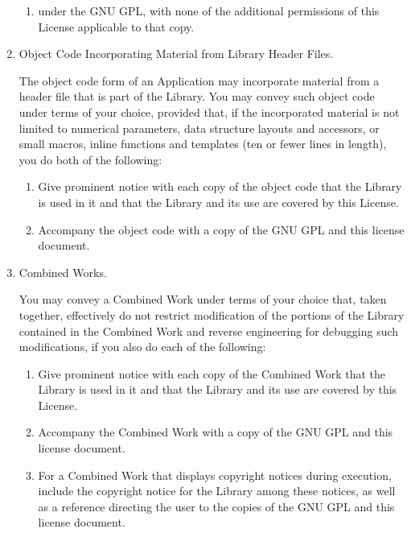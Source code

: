 \documentclass[11pt,a4paper, twoside]{article}
\begin{document}
\begin{enumerate}
\begin{enumerate}
   \item under the GNU GPL, with none of the additional permissions of
   this License applicable to that copy.
   \end{enumerate}

\item Object Code Incorporating Material from Library Header Files.

  The object code form of an Application may incorporate material from
a header file that is part of the Library.  You may convey such object
code under terms of your choice, provided that, if the incorporated
material is not limited to numerical parameters, data structure
layouts and accessors, or small macros, inline functions and templates
(ten or fewer lines in length), you do both of the following:

   \begin{enumerate}
   \item Give prominent notice with each copy of the object code that the
   Library is used in it and that the Library and its use are
   covered by this License.

   \item Accompany the object code with a copy of the GNU GPL and this license
   document.
   \end{enumerate}

\item Combined Works.

  You may convey a Combined Work under terms of your choice that,
taken together, effectively do not restrict modification of the
portions of the Library contained in the Combined Work and reverse
engineering for debugging such modifications, if you also do each of
the following:

   \begin{enumerate}
   \item Give prominent notice with each copy of the Combined Work that
   the Library is used in it and that the Library and its use are
   covered by this License.

   \item Accompany the Combined Work with a copy of the GNU GPL and this license
   document.

   \item For a Combined Work that displays copyright notices during
   execution, include the copyright notice for the Library among
   these notices, as well as a reference directing the user to the
   copies of the GNU GPL and this license document.


\end{enumerate}
\end{enumerate}
\end{document}

